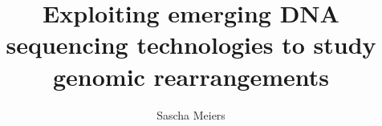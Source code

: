 \documentclass[twoside, titlepage, DIV=8, BCOR=8.5mm, open=right, chapterprefix=false]{scrbook}
\title{Exploiting emerging DNA sequencing technologies to study genomic rearrangements}
\author{Sascha Meiers}
\begin{document}


\maketitle
\frontmatter


\tableofcontents
\listofabbrev
\listoffigs
\listoftabs


\mainmatter







\appendix

\listofsoftware


\listofreferences
\end{document}
